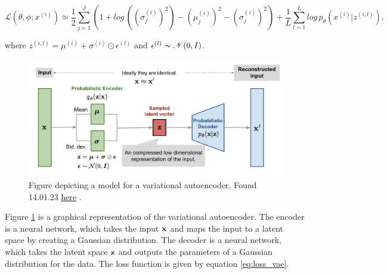 \begin{equation}\label{eq:loss_vae}
    \mathcal{L}(\theta, \phi;x^{(i)}) \simeq \frac{1}{2}\sum_{j=1}^{J}(1 + log\, ((\sigma^{(i)}_{j})^2) - (\mu^{(i)}_{j})^2 - (\sigma^{(i)}_{j})^2) +\frac{1}{L}\sum_{l=1}^{L}log\, p_{\theta}(x^{(i)}|z^{(i,l)}),
\end{equation}

where $z^{(i,l)} = \mu^{(i)} + \sigma^{(i)} \odot \epsilon^{(l)}$ and $ \epsilon^{(l)} \thicksim \mathcal{N}(0,I)$. 




\begin{figure}[H]
    \includegraphics[width=\linewidth]{Figures/Machinelearning/vae-gaussian.png}
    \caption{Figure depicting a model for a variational autoencoder. Found 14.01.23 \href{https://lilianweng.github.io/posts/2018-08-12-vae/vae-gaussian.png}{here} \cite{weng2018VAE}. }
    \label{fig:vae}
\end{figure}

Figure \ref{fig:vae} is a graphical representation of the variational autoencoder. The encoder is a neural network, which takes 
the input $\bf{x}$ and maps the input to a latent space by creating a Gaussian distribution. The decoder is a neural network, 
which takes the latent space $\bf{z}$ and outputs the parameters of a Gaussian distribution for the data.
The loss function is given by equation \ref{eq:loss_vae}.